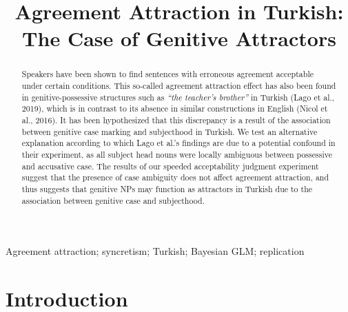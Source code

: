 \documentclass[]{interact}
\theoremstyle{plain}%
\theoremstyle{definition}
\theoremstyle{remark}
\begin{document}

\title{Agreement Attraction in Turkish: The Case of Genitive Attractors}

\author{
}

\maketitle

\begin{abstract}
Speakers have been shown to find sentences with erroneous agreement acceptable under certain conditions. This so-called agreement attraction effect has also been found in genitive-possessive structures such as \textit{``the teacher's brother''} in Turkish (Lago et al., 2019), which is in contrast to its absence in similar constructions in English (Nicol et al., 2016). It has been hypothesized that this discrepancy is a result of the association between genitive case marking and subjecthood in Turkish. We test an alternative explanation according to which Lago et al.'s findings are due to a potential confound in their experiment, as all subject head nouns were locally ambiguous between possessive and accusative case. The results of our speeded acceptability judgment experiment suggest that the presence of case ambiguity does not affect agreement attraction, and thus suggests that genitive NPs may function as attractors in Turkish due to the association between genitive case and subjecthood.



\end{abstract}

\begin{keywords}
Agreement attraction; syncretism; Turkish; Bayesian GLM; replication
\end{keywords}


\section{Introduction}
\end{document}
